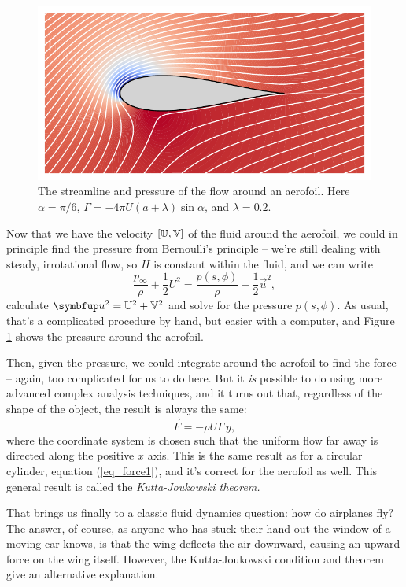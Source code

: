\begin{figure}
\centering\includegraphics[width=\linewidth]{Figures/Chapter4/fig_aerofoil_stream}
\caption{The streamline and pressure of the flow around an aerofoil.  Here $\alpha = \pi/6$, $\Gamma = -4\pi U(a+\lambda) \sin \alpha$, and $\lambda = 0.2$.}
\label{fig_aerofoil_stream}
\end{figure}

Now that we have the velocity $[\mathbb{U}, \mathbb{V}]$ of the fluid around the aerofoil, we could in principle find the pressure from Bernoulli's principle -- we're still dealing with steady, irrotational flow, so $H$ is constant within the fluid, and we can write
\[
\frac{p_\infty}{\rho} + \frac{1}{2} U^2 = \frac{p(s, \phi)}{\rho} + \frac{1}{2} \vec{u}^2,
\]
calculate $\vec{u}^2 = \U^2 + \V^2$ and solve for the pressure $p(s, \phi)$.  As usual, that's a complicated procedure by hand, but easier with a computer, and Figure \ref{fig_aerofoil_stream} shows the pressure around the aerofoil.

Then, given the pressure, we could integrate around the aerofoil to find the force -- again, too complicated for us to do here.  But it \emph{is} possible to do using more advanced complex analysis techniques, and it turns out that, regardless of the shape of the object, the result is always the same:
\begin{equation}
\vec{F} = - \rho U \Gamma \, \unit{y},
\end{equation}
where the coordinate system is chosen such that the uniform flow far away is directed along the positive $x$ axis.  This is the same result as for a circular cylinder, equation (\ref{eq_force1}), and it's correct for the aerofoil as well.  This general result is called the \emph{Kutta-Joukowski theorem.}

That brings us finally to a classic fluid dynamics question:  how do airplanes fly?  The answer, of course, as anyone who has stuck their hand out the window of a moving car knows, is that the wing deflects the air downward, causing an upward force on the wing itself.  However, the Kutta-Joukowski condition and theorem give an alternative explanation.

